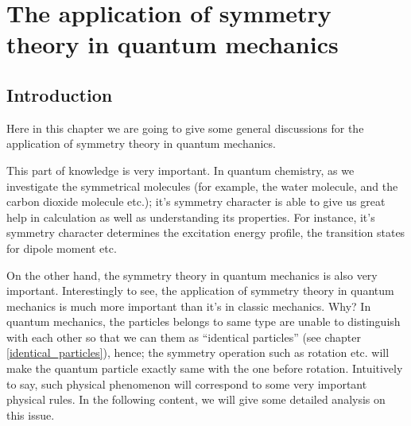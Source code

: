 
\chapter{The application of symmetry theory in quantum mechanics}
%
%
\section{Introduction}
%
%
Here in this chapter we are going to give some general discussions
for the application of symmetry theory in quantum mechanics.

This part of knowledge is very important. In quantum chemistry, as
we investigate the symmetrical molecules (for example, the water
molecule, and the carbon dioxide molecule etc.); it's symmetry
character is able to give us great help in calculation as well as
understanding its properties. For instance, it's symmetry character
determines the excitation energy profile, the transition states for
dipole moment etc.

On the other hand, the symmetry theory in quantum mechanics is also
very important. Interestingly to see, the application of symmetry
theory in quantum mechanics is much more important than it's in
classic mechanics. Why? In quantum mechanics, the particles belongs
to same type are unable to distinguish with each other so that we
can them as ``identical particles'' (see chapter
\ref{identical_particles}), hence; the symmetry operation such as
rotation etc. will make the quantum particle exactly same with the
one before rotation. Intuitively to say, such physical phenomenon
will correspond to some very important physical rules. In the
following content, we will give some detailed analysis on this
issue.

